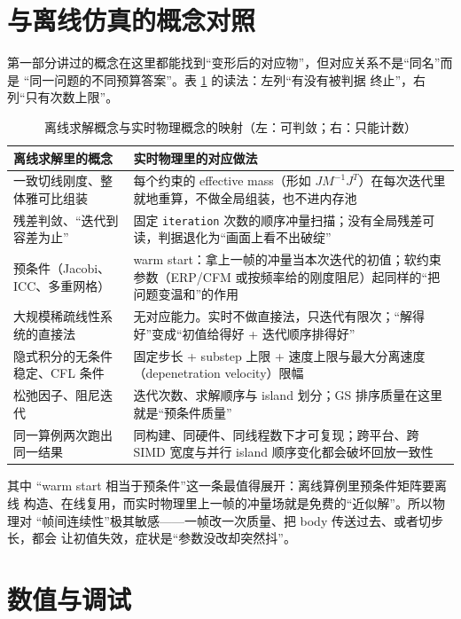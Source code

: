 \documentclass[12pt,a4paper,fontset=fandol]{ctexbook}
\newcommand{\Tp}[1]{\texttt{#1}}
\begin{document}
\section{与离线仿真的概念对照}
\label{sec:ch13-vs-offline}

第一部分讲过的概念在这里都能找到``变形后的对应物''，但对应关系不是``同名''而是
``同一问题的不同预算答案''。表 \ref{tab:ch13-mapping} 的读法：左列``有没有被判据
终止''，右列``只有次数上限''。

\begin{table}[htbp]
\centering
\caption{离线求解概念与实时物理概念的映射（左：可判敛；右：只能计数）}
\label{tab:ch13-mapping}
\begin{tabular}{>{\raggedright\arraybackslash}p{}
                >{\raggedright\arraybackslash}p{}}
\toprule
离线求解里的概念 & 实时物理里的对应做法 \\
\midrule
一致切线刚度、整体雅可比组装 & 每个约束的 effective mass（形如 $J M^{-1} J^{T}$）在每次迭代里就地重算，不做全局组装，也不进内存池 \\
残差判敛、``迭代到容差为止'' & 固定 \Tp{iteration} 次数的顺序冲量扫描；没有全局残差可读，判据退化为``画面上看不出破绽'' \\
预条件（Jacobi、ICC、多重网格） & warm start：拿上一帧的冲量当本次迭代的初值；软约束参数（ERP/CFM 或按频率给的刚度阻尼）起同样的``把问题变温和''的作用 \\
大规模稀疏线性系统的直接法 & 无对应能力。实时不做直接法，只迭代有限次；``解得好''变成``初值给得好 + 迭代顺序排得好'' \\
隐式积分的无条件稳定、CFL 条件 & 固定步长 + substep 上限 + 速度上限与最大分离速度（depenetration velocity）限幅 \\
松弛因子、阻尼迭代 & 迭代次数、求解顺序与 island 划分；GS 排序质量在这里就是``预条件质量'' \\
同一算例两次跑出同一结果 & 同构建、同硬件、同线程数下才可复现；跨平台、跨 SIMD 宽度与并行 island 顺序变化都会破坏回放一致性 \\
\bottomrule
\end{tabular}
\end{table}

其中 ``warm start 相当于预条件''这一条最值得展开：离线算例里预条件矩阵要离线
构造、在线复用，而实时物理里上一帧的冲量场就是免费的``近似解''。所以物理对
``帧间连续性''极其敏感——一帧改一次质量、把 body 传送过去、或者切步长，都会
让初值失效，症状是``参数没改却突然抖''。

\section{数值与调试}
\label{sec:ch13-numerics}
\end{document}
